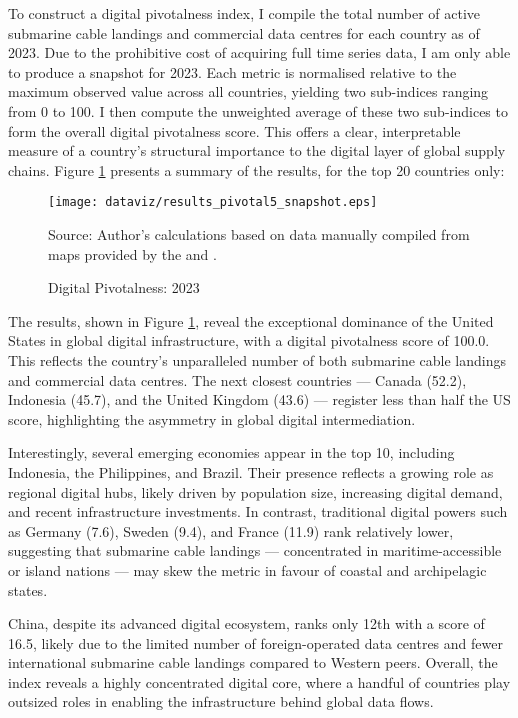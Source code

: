 \documentclass[11pt]{article}
\begin{document}
To construct a digital pivotalness index, I compile the total number of active submarine cable landings and commercial data centres for each country as of 2023. Due to the prohibitive cost of acquiring full time series data, I am only able to produce a snapshot for 2023. Each metric is normalised relative to the maximum observed value across all countries, yielding two sub-indices ranging from 0 to 100. I then compute the unweighted average of these two sub-indices to form the overall digital pivotalness score. This  offers a clear, interpretable measure of a country’s structural importance to the digital layer of global supply chains. Figure \ref{fig:pivotal_digital} presents a summary of the results, for the top 20 countries only:

\begin{figure}[H]
	\caption{Digital Pivotalness: 2023}
	\label{fig:pivotal_digital}
	\centering
        \phantom{a}
	\texttt{[image: dataviz/results\_pivotal5\_snapshot.eps]}

	{\footnotesize Source: Author's calculations based on data manually compiled from maps provided by the \citet{datacentermap2023} and \citet{submarinecablemap2023}.}
\end{figure}

The results, shown in Figure \ref{fig:pivotal_digital}, reveal the exceptional dominance of the United States in global digital infrastructure, with a digital pivotalness score of 100.0. This reflects the country's unparalleled number of both submarine cable landings and commercial data centres. The next closest countries — Canada (52.2), Indonesia (45.7), and the United Kingdom (43.6) — register less than half the US score, highlighting the asymmetry in global digital intermediation.

Interestingly, several emerging economies appear in the top 10, including Indonesia, the Philippines, and Brazil. Their presence reflects a growing role as regional digital hubs, likely driven by population size, increasing digital demand, and recent infrastructure investments. In contrast, traditional digital powers such as Germany (7.6), Sweden (9.4), and France (11.9) rank relatively lower, suggesting that submarine cable landings — concentrated in maritime-accessible or island nations — may skew the metric in favour of coastal and archipelagic states.

China, despite its advanced digital ecosystem, ranks only 12th with a score of 16.5, likely due to the limited number of foreign-operated data centres and fewer international submarine cable landings compared to Western peers. Overall, the index reveals a highly concentrated digital core, where a handful of countries play outsized roles in enabling the infrastructure behind global data flows.
\end{document}
